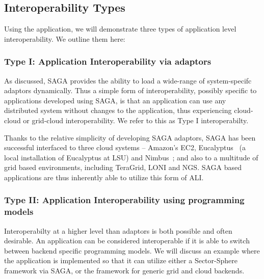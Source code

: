 \documentclass[3p,twocolumn]{elsarticle}
\begin{document}
\subsection{Interoperability Types}

Using the \wc application, we will demonstrate three types of
application level interoperability. We outline them here:


\subsubsection{Type I: Application Interoperability via adaptors}
%
%

As discussed, SAGA provides the ability to load a wide-range of
system-specifc adaptors dynamically. Thus a simple form of
interoperability, possibly specific to applications developed using
SAGA, is that an application can use any distributed system without
changes to the application, thus experiencing cloud-cloud or
grid-cloud interoperability.  We refer to this as Type I
interoperabilty.


Thanks to the relative simplicity of developing SAGA adaptors, SAGA
has been successful interfaced to three cloud systems -- Amazon's EC2,
Eucalyptus~\cite{eucalyptus} (a local installation of Eucalyptus at
LSU) and Nimbus~\cite{nimbus}; and also to a multitude of grid based
environments, including TeraGrid, LONI and NGS.  SAGA based
applications are thus inherently able to utilize this form of ALI.

\subsubsection{Type II: Application Interoperability using programming
  models} %
%
%

Interoperabilty at a higher level than adaptors is both possible and
often desirable. An application can be considered interoperable if it
is able to switch between backend specific programming models.  We
will discuss an example where the \wc application is implemented so
that it can utilize either a Sector-Sphere framework via SAGA, or the
\smr framework for generic grid and cloud backends.
\end{document}
